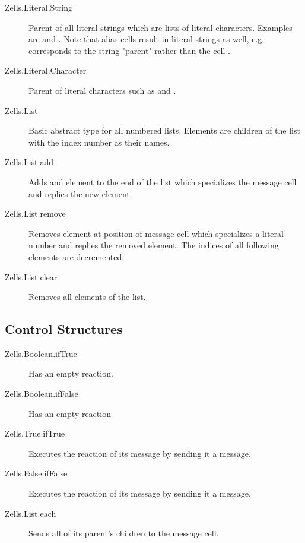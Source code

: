 \begin{description}
\item[Zells.Literal.String]{Parent of all literal strings which are lists of literal characters. Examples are  and . Note that alias cells result in literal strings as well, e.g.  corresponds to the string "parent" rather than the cell .}
\item[Zells.Literal.Character]{Parent of literal characters such as  and .}

\item[Zells.List]{Basic abstract type for all numbered lists. Elements are children of the list with the index number as their names.}

\item[Zells.List.add]{Adds and element to the end of the list which specializes the message cell and replies the new element.}

\item[Zells.List.remove]{Removes element at position of message cell which specializes a literal number and replies the removed element. The indices of all following elements are decremented.}

\item[Zells.List.clear]{Removes all elements of the list.}

\end{description}

\subsection{Control Structures}
\begin{description}
\item[Zells.Boolean.ifTrue]{Has an empty reaction.}

\item[Zells.Boolean.ifFalse]{Has an empty reaction }

\item[Zells.True.ifTrue]{Executes the reaction of its message by sending it a message.}

\item[Zells.False.ifFalse]{Executes the reaction of its message by sending it a message.}

\item[Zells.List.each]{Sends all of its parent's children to the message cell.}

\end{description}


